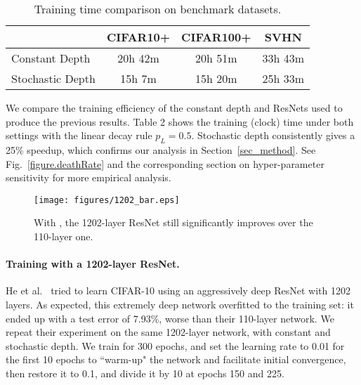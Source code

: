 \documentclass[runningheads]{llncs}
\begin{document}
\begin{table}[t!]
\label{table.training_time}
\caption{Training time comparison on benchmark datasets.}
\begin{center}
\resizebox{0.65\textwidth}{!}
{
\begin{small}
\begin{tabular}{lccc}
\hline
		  	& CIFAR10+   & CIFAR100+   & SVHN	\\
\hline
Constant Depth		
		    & 20h 42m    & 20h 51m	   & 33h 43m \\
Stochastic Depth
			& 15h 7m	 & 15h 20m	   & 25h 33m \\
\hline
\end{tabular}
\end{small}
}
\vspace{-5ex}
\end{center}
\end{table}  We compare the training efficiency of the constant depth and \name{} ResNets used to produce the previous results. Table 2 shows the training (clock) time under both settings with the linear decay rule $p_L=0.5$. Stochastic depth consistently gives a 25\% speedup, which confirms our analysis in Section~\ref{sec_method}. See Fig.~\ref{figure.deathRate} and the corresponding section on hyper-parameter sensitivity for more empirical analysis. 

\begin{wrapfigure}{r}{0.5\textwidth}
	\vspace{-15ex}
	\begin{center}
		\texttt{[image: figures/1202\_bar.eps]}
	\end{center}
	\vspace{-10ex}
	\caption{With \name{}, the 1202-layer ResNet still significantly improves over the 110-layer one.}
	\vspace{-4ex}
	\label{figure.1202compare}
\end{wrapfigure}

\paragraph{\textbf{Training with a 1202-layer ResNet.}}
He et al.~\cite{he2015deep} tried to learn CIFAR-10 using an aggressively deep ResNet with 1202 layers. As expected, this extremely deep network overfitted to the training set: it ended up with a test error of 7.93\%, worse than their 110-layer network. We repeat their experiment on the same 1202-layer network, with constant and stochastic depth. We train for 300 epochs, and set the learning rate to 0.01 for the first 10 epochs to ``warm-up" the network and facilitate initial convergence, then restore it to 0.1, and divide it by 10 at epochs 150 and 225.
\end{document}
